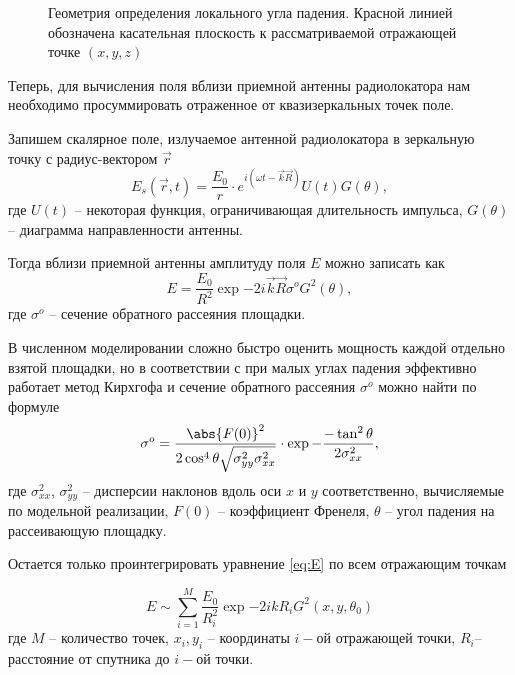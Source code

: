 \begin{figure}[h!]
    \centering
    \def\svgwidth{0.75\linewidth}
    
    \caption{Геометрия определения локального угла падения. Красной линией
    обозначена касательная плоскость к рассматриваемой отражающей точке
$(x,y,z)$}
    \label{fig:local_theta}
\end{figure}


Теперь, для вычисления поля вблизи приемной антенны радиолокатора нам
необходимо просуммировать отраженное от квазизеркальных точек поле.


Запишем скалярное поле, излучаемое антенной радиолокатора в зеркальную точку с радиус-вектором $\vec
r$
\begin{equation}
    E_{s}(\vec r,t) = \frac{E_0}{r}  \cdot  e^{i(\omega t - \vec k \vec
    R)} U(t)G(\theta), 
\end{equation}
где $U(t)$ -- некоторая функция, ограничивающая длительность импульса,
$G(\theta)$ -- диаграмма направленности антенны.



Тогда вблизи приемной антенны амплитуду поля $E$ можно записать как
\begin{equation}
    \label{eq:E}
    E =  \frac{E_0}{R^2} \exp{-2i\vec k\vec R} \sigma^o 
    G^2(\theta) , 
\end{equation}
где $\sigma^o$ -- сечение обратного рассеяния площадки.

В численном моделировании сложно быстро оценить мощность каждой отдельно взятой
площадки, но в соответствии с \cite{bass-and-fuks} при малых углах падения
эффективно работает метод Кирхгофа и сечение обратного рассеяния $\sigma^o$
можно найти по формуле
 \begin{equation}
     \label{eq:frenel}
     \sigma^o = \frac{\abs{F(0)}^2}{2\cos^4\theta \sqrt{\sigma^2_{yy}\sigma^2_{xx}}}
     \cdot \exp{-\frac{-\tan^2 \theta}{2 \sigma^2_{xx}}},
 \end{equation}
 где $\sigma_{xx}^2$, $\sigma_{yy}^2$ -- дисперсии наклонов вдоль оси $x$ и $y$
 соответственно, вычисляемые по модельной реализации, $F(0)$ -- коэффициент
 Френеля,  $\theta$ -- угол падения на рассеивающую площадку. 


Остается только проинтегрировать уравнение \eqref{eq:E} по всем отражающим
точкам 

\begin{equation}
    E \sim \sum\limits_{i=1}^{M} \frac{E_0}{R_i^2} \exp{-2ikR_i}
    G^2(x,y,\theta_0)
\end{equation}
где $M$ -- количество точек,  $x_i,y_i$ -- координаты  $i-$ой отражающей точки,
 $R_i$-- расстояние от спутника до  $i-$ой точки.


